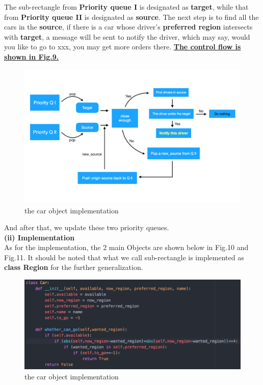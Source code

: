 \documentclass[10pt,journal]{IEEEtran}
\begin{document}
 The sub-rectangle from  \textbf{Priority queue I} is designated as \textbf{target}, while that from \textbf{Priority queue II} is designated as \textbf{source}. The next step is to find all the cars in the \textbf{source}, if there is a car whose driver's \textbf{preferred region} intersects with \textbf{target}, a message will be sent to notify the driver, which may say, would you like to go to xxx, you may get more orders there. \underline{\textbf{ The control flow is shown in Fig.9.}}\\
 
 \begin{figure}[!ht]
    \centering
    \includegraphics[width=1.0\columnwidth]{Fig/control_flow.png}
    \caption{the car object implementation}
 \end{figure}

And after that, we update these two priority queues.\\

\textbf{(ii) Implementation}\\

As for the implementation, the 2 main Objects are shown below in Fig.10 and Fig.11. It should be noted that what we call sub-rectangle is implemented as \textbf{class Region} for the further generalization.
 \begin{figure}[!ht]
    \centering
    \includegraphics[width=1.0\columnwidth]{Fig/class_car.png}
    \caption{the car object implementation}
 \end{figure}
\end{document}
